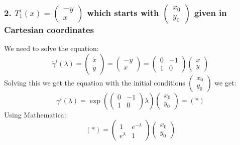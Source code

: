 \documentclass{article}
\begin{document}
\subsubsection*{2. $T_1^i(x)=\left( \begin{array}{c} -y\\x \end{array}\right)$ which starts with  $\left( \begin{array}{c} x_0 \\ y_0 \end{array}\right)$ given in Cartesian coordinates}
We need to solve the equation:
\begin{equation*}
    \dot{\gamma}^i(\lambda)=
    \left( \begin{array}{c} \dot{x}\\\dot{y} \end{array}\right)
    =\left( \begin{array}{c} -y\\x \end{array}\right)
    =\begin{pmatrix}
        0 & -1\\
        1 & 0
    \end{pmatrix}\left( \begin{array}{c} x\\y \end{array}\right)
\end{equation*}
Solving this we get the equation with the initial conditions  $\left( \begin{array}{c} x_0 \\ y_0 \end{array}\right)$ we get:
\begin{equation*}
    \gamma^i(\lambda)=\exp \left(\begin{pmatrix}
        0 & -1\\
        1 & 0
    \end{pmatrix}\lambda\right)\left( \begin{array}{c} x_0 \\ y_0 \end{array}\right)=(*)
\end{equation*}
Using Mathematica:
\begin{equation*}
\boxed{
    (*)=\begin{pmatrix}
        1 & e^{-\lambda}\\
        e^{\lambda} & 1
    \end{pmatrix}\left( \begin{array}{c} x_0 \\ y_0 \end{array}\right)}
\end{equation*}
\end{document}

